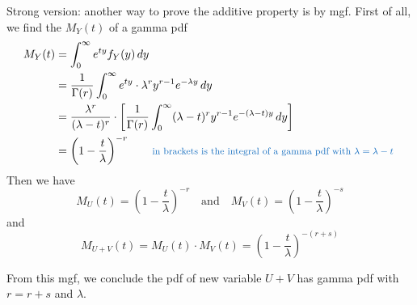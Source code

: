 \documentclass[11pt]{article}
\begin{document}
Strong version: another way to prove the additive property is by mgf.  First of all, we find the $M_Y(t)$ of a gamma pdf
\[
\begin{aligned}
M_Y (t) 
	&= \int _0 ^\infty e^{ty} f_Y(y) \, dy \\ 
	&=  \frac{1}{\Gamma(r)} \int _0 ^\infty  e^{ty} \cdot \lambda ^r y^{r-1} e^{-\lambda y} \, dy \\
	&= \frac{\lambda ^r}{(\lambda - t) ^r} \cdot \left[ \frac{1}{\Gamma(r)} \int _0 ^\infty  (\lambda - t) ^r y^{r-1} e^{-(\lambda - t) y} \, dy \right] \\
	&= \left(1- \frac{t}{\lambda} \right) ^{-r}  \qquad  \color{RoyalBlue}  \text{\footnotesize in brackets is the integral of a gamma pdf with $\lambda = \lambda - t$ }\\
\end{aligned}
\]
Then we have
\[
M_U(t) = \left(1- \frac{t}{\lambda} \right) ^{-r} \quad \text {and} \quad M_V(t) = \left(1- \frac{t}{\lambda} \right) ^{-s}
\]
and
\[
M_{U+V} (t) = M_U(t) \cdot M_V(t) = \left(1- \frac{t}{\lambda} \right) ^{-(r+s)} 
\]

From this mgf,  we conclude the pdf of new variable $U+V$ has gamma pdf with $r=r+s$ and $\lambda$.
 









\clearpage

\printbibliography [title={Reference}]


\end{document}
